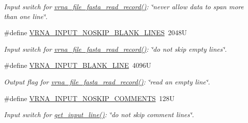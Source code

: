\begin{DoxyCompactItemize}
\begin{DoxyCompactList}\small\item\em Input switch for \hyperlink{group__file__formats_ga8cfb7e271efc9e1f34640acb85475639}{vrna\+\_\+file\+\_\+fasta\+\_\+read\+\_\+record()}\+: {\itshape \char`\"{}never allow data to span more than one line\char`\"{}}. \end{DoxyCompactList}\item 
\mbox{\label{group__utils_gab4db885222b3b69608310d7c7e63e286}} 
\#define \hyperlink{group__utils_gab4db885222b3b69608310d7c7e63e286}{V\+R\+N\+A\+\_\+\+I\+N\+P\+U\+T\+\_\+\+N\+O\+S\+K\+I\+P\+\_\+\+B\+L\+A\+N\+K\+\_\+\+L\+I\+N\+ES}~2048U
\begin{DoxyCompactList}\small\item\em Input switch for \hyperlink{group__file__formats_ga8cfb7e271efc9e1f34640acb85475639}{vrna\+\_\+file\+\_\+fasta\+\_\+read\+\_\+record()}\+: {\itshape \char`\"{}do not skip empty lines\char`\"{}}. \end{DoxyCompactList}\item 
\mbox{\label{group__utils_ga305474b93ccb79ae4c7754016a8ddd84}} 
\#define \hyperlink{group__utils_ga305474b93ccb79ae4c7754016a8ddd84}{V\+R\+N\+A\+\_\+\+I\+N\+P\+U\+T\+\_\+\+B\+L\+A\+N\+K\+\_\+\+L\+I\+NE}~4096U
\begin{DoxyCompactList}\small\item\em Output flag for \hyperlink{group__file__formats_ga8cfb7e271efc9e1f34640acb85475639}{vrna\+\_\+file\+\_\+fasta\+\_\+read\+\_\+record()}\+: {\itshape \char`\"{}read an empty line\char`\"{}}. \end{DoxyCompactList}\item 
\mbox{\label{group__utils_ga0f6311f11bed1842e3a527ab27b294c6}} 
\#define \hyperlink{group__utils_ga0f6311f11bed1842e3a527ab27b294c6}{V\+R\+N\+A\+\_\+\+I\+N\+P\+U\+T\+\_\+\+N\+O\+S\+K\+I\+P\+\_\+\+C\+O\+M\+M\+E\+N\+TS}~128U
\begin{DoxyCompactList}\small\item\em Input switch for \hyperlink{group__utils_ga8ef1835eb83f542396f59f0b205965e5}{get\+\_\+input\+\_\+line()}\+: {\itshape \char`\"{}do not skip comment lines\char`\"{}}. \end{DoxyCompactList}\item 
\mbox{\label{group__utils_gaf2062e0eeefffd3ed639af460b3d4fab}} 

\end{DoxyCompactItemize}
